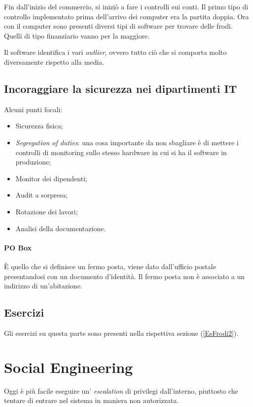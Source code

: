 Fin dall'inizio del commercio, si iniziò a fare i controlli sui conti. Il
primo tipo di controllo implementato prima dell'arrivo dei computer era la
partita doppia. Ora con il computer sono presenti diversi tipi di software
per trovare delle frodi. Quelli di tipo finanziario vanno per la maggiore.

Il software identifica i vari \textit{outlier}, ovvero tutto ciò che si
comporta molto diversamente rispetto alla media.

\subsection{Incoraggiare la sicurezza nei dipartimenti IT}

Alcuni punti focali:
\begin{itemize}
  \item Sicurezza fisica;
  \item \textit{Segregation of duties}: una cosa importante da non sbagliare è di mettere i controlli di monitoring
  sullo stesso hardware in cui si ha il software in produzione;
  \item Monitor dei dipendenti;
  \item Audit a sorpresa;
  \item Rotazione dei lavori;
  \item Analisi della documentazione.
\end{itemize}

\paragraph*{PO Box}

È quello che si definisce un fermo posta, viene dato dall'ufficio postale
presentandosi con un documento d'identità. Il fermo posta non è associato a un
indirizzo di un'abitazione.

\subsection{Esercizi}

Gli esercizi su questa parte sono presenti nella rispettiva sezione
(\ref{EsFrodi2}).

\section{Social Engineering}
		
Oggi è più facile eseguire un' \textit{escalation} di privilegi dall'interno,
piuttosto che tentare di entrare nel sistema in maniera non autorizzata.

